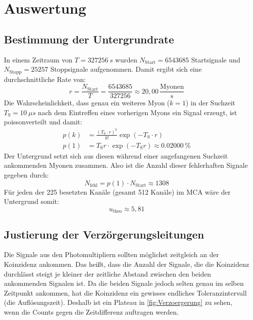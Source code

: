 \section{Auswertung}
    \subsection{Bestimmung der Untergrundrate}
    \label{sec:untergrund}
        In einem Zeitraum von $T = \SI{327256}{s}$ wurden $N_{\text{Start}} = 6543685$ Startsignale und $N_{\text{Stopp}} = 25257$
        Stoppsignale aufgenommen. Damit ergibt sich eine durchschnittliche Rate von:
        \begin{equation*}
            r = \frac{N_{\text{Start}}}{T} = \frac{6543685}{327256} \approx 20,00 \, \frac{\text{Myonen}}{\text{s}}
        \end{equation*}
        Die Wahrscheinlichkeit, dass genau ein weiteres Myon ($k = 1$) in der Suchzeit $T_\text{S} = \SI{10}{\mu s}$ nach dem Eintreffen eines vorherigen Myons ein Signal erzeugt, ist poissonverteilt und damit:
        \begin{align*}
            p(k) &= \frac{(T_{\text{S}} \cdot r)^k}{k!} \exp\left(-T_{\text{S}} \cdot r\right) \\[10pt]
            p(1) &= T_{\text{S}} r \cdot \exp\left(-T_{\text{S}}  r\right) \approx \SI{0,02000}{\%}
        \end{align*}
        Der Untergrund setzt sich aus diesen während einer angefangenen Suchzeit ankommenden Myonen zusammen. Also ist die Anzahl dieser fehlerhaften Signale gegeben durch:
        \begin{equation*}
            N_{\text{fehl}} = p(1) \cdot N_{\text{Start}} \approx 1308
        \end{equation*}
        Für jeden der 225 besetzten Kanäle (gesamt 512 Kanäle) im MCA wäre der Untergrund somit:
        \begin{equation*}
            u_{\text{theo}} \approx 5,81
        \end{equation*}

    \subsection{Justierung der Verzörgerungsleitungen}
        Die Signale aus den Photomultipliern sollten möglichst zeitgleich an der Koinzidenz ankommen. Das heißt, dass die Anzahl der Signale, die die Koinzidenz durchlässt steigt je kleiner der zeitliche Abstand zwischen den beiden ankommenden Signalen ist. Da die beiden Signale jedoch selten genau im selben Zeitpunkt ankommen, hat die Koinzidenz ein gewisses endliches Toleranzintervall (die Auflösungszeit). Deshalb ist ein Plateau in \autoref{fig:Verzoergerung} zu sehen, wenn die Counts gegen die Zeitdifferenz auftragen werden.
        
